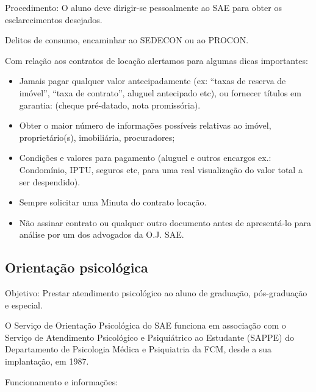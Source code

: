 Procedimento: O aluno deve dirigir-se pessoalmente ao SAE para obter os
esclarecimentos desejados.

Delitos de consumo, encaminhar ao SEDECON ou ao PROCON.

Com relação aos contratos de locação alertamos para algumas dicas importantes:

\begin{itemize}
    \item  Jamais pagar qualquer valor antecipadamente (ex: ``taxas de reserva
        de imóvel'', ``taxa de contrato'', aluguel antecipado etc), ou fornecer
        títulos em garantia: (cheque pré-datado, nota promissória).

    \item  Obter o maior número de informações possíveis relativas ao imóvel,
        proprietário(s), imobiliária, procuradores;

    \item  Condições e valores para pagamento (aluguel e outros encargos ex.:
        Condomínio, IPTU, seguros etc, para uma real visualização do valor total
        a ser despendido).

    \item  Sempre solicitar uma Minuta do contrato locação.

    \item  Não assinar contrato ou qualquer outro documento antes de
        apresentá-lo para análise por um dos advogados da O.J. SAE.
\end{itemize}

\subsection{Orientação psicológica}

Objetivo: Prestar atendimento psicológico ao aluno de graduação, pós-graduação e
especial.

O Serviço de Orientação Psicológica do SAE funciona em associação com o Serviço
de Atendimento Psicológico e Psiquiátrico ao Estudante (SAPPE) do Departamento
de Psicologia Médica e Psiquiatria da FCM, desde a sua implantação, em 1987.

Funcionamento e informações:


